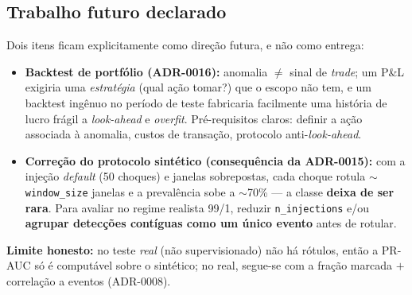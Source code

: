 \subsection{Trabalho futuro declarado}
\label{sec:m12-futuro}
Dois itens ficam explicitamente como direção futura, e não como entrega:
\begin{itemize}[noitemsep]
  \item \textbf{Backtest de portfólio (ADR-0016):} anomalia $\ne$ sinal de \emph{trade}; um P\&L
        exigiria uma \emph{estratégia} (qual ação tomar?) que o escopo não tem, e um backtest ingênuo
        no período de teste fabricaria facilmente uma história de lucro frágil a \emph{look-ahead} e
        \emph{overfit}. Pré-requisitos claros: definir a ação associada à anomalia, custos de transação,
        protocolo anti-\emph{look-ahead}.
  \item \textbf{Correção do protocolo sintético (consequência da ADR-0015):} com a injeção \emph{default}
        (50 choques) e janelas sobrepostas, cada choque rotula ${\sim}$\texttt{window\_size} janelas e
        a prevalência sobe a ${\sim}$70\% --- a classe \textbf{deixa de ser rara}. Para avaliar no
        regime realista 99/1, reduzir \texttt{n\_injections} e/ou \textbf{agrupar detecções contíguas
        como um único evento} antes de rotular.
\end{itemize}

\noindent\textbf{Limite honesto:} no teste \emph{real} (não supervisionado) não há rótulos, então a
PR-AUC só é computável sobre o sintético; no real, segue-se com a fração marcada $+$ correlação a
eventos (ADR-0008).
